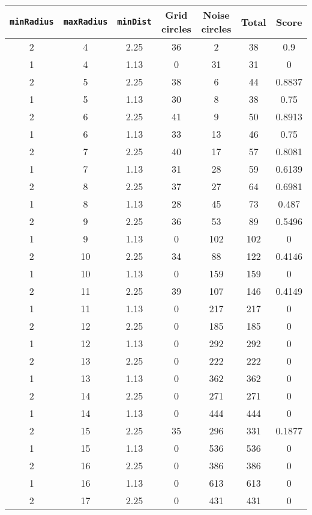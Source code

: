 \documentclass[letterpaper, 12pt]{article}
\begin{document}
\begin{longtable}{|c|c|c|c|c|c|c|}
\hline
\textbf{\texttt{minRadius}} & \textbf{\texttt{maxRadius}} & \textbf{\texttt{minDist}} & \textbf{Grid circles} & \textbf{Noise circles} & \textbf{Total} & \textbf{Score} \\
\hline
2 & 4 & 2.25 & 36 & 2 & 38 & 0.9 \\
\hline
1 & 4 & 1.13 & 0 & 31 & 31 & 0 \\
\hline
2 & 5 & 2.25 & 38 & 6 & 44 & 0.8837 \\
\hline
1 & 5 & 1.13 & 30 & 8 & 38 & 0.75 \\
\hline
2 & 6 & 2.25 & 41 & 9 & 50 & 0.8913 \\
\hline
1 & 6 & 1.13 & 33 & 13 & 46 & 0.75 \\
\hline
2 & 7 & 2.25 & 40 & 17 & 57 & 0.8081 \\
\hline
1 & 7 & 1.13 & 31 & 28 & 59 & 0.6139 \\
\hline
2 & 8 & 2.25 & 37 & 27 & 64 & 0.6981 \\
\hline
1 & 8 & 1.13 & 28 & 45 & 73 & 0.487 \\
\hline
2 & 9 & 2.25 & 36 & 53 & 89 & 0.5496 \\
\hline
1 & 9 & 1.13 & 0 & 102 & 102 & 0 \\
\hline
2 & 10 & 2.25 & 34 & 88 & 122 & 0.4146 \\
\hline
1 & 10 & 1.13 & 0 & 159 & 159 & 0 \\
\hline
2 & 11 & 2.25 & 39 & 107 & 146 & 0.4149 \\
\hline
1 & 11 & 1.13 & 0 & 217 & 217 & 0 \\
\hline
2 & 12 & 2.25 & 0 & 185 & 185 & 0 \\
\hline
1 & 12 & 1.13 & 0 & 292 & 292 & 0 \\
\hline
2 & 13 & 2.25 & 0 & 222 & 222 & 0 \\
\hline
1 & 13 & 1.13 & 0 & 362 & 362 & 0 \\
\hline
2 & 14 & 2.25 & 0 & 271 & 271 & 0 \\
\hline
1 & 14 & 1.13 & 0 & 444 & 444 & 0 \\
\hline
2 & 15 & 2.25 & 35 & 296 & 331 & 0.1877 \\
\hline
1 & 15 & 1.13 & 0 & 536 & 536 & 0 \\
\hline
2 & 16 & 2.25 & 0 & 386 & 386 & 0 \\
\hline
1 & 16 & 1.13 & 0 & 613 & 613 & 0 \\
\hline
2 & 17 & 2.25 & 0 & 431 & 431 & 0 \\
\hline

\end{longtable}
\end{document}
